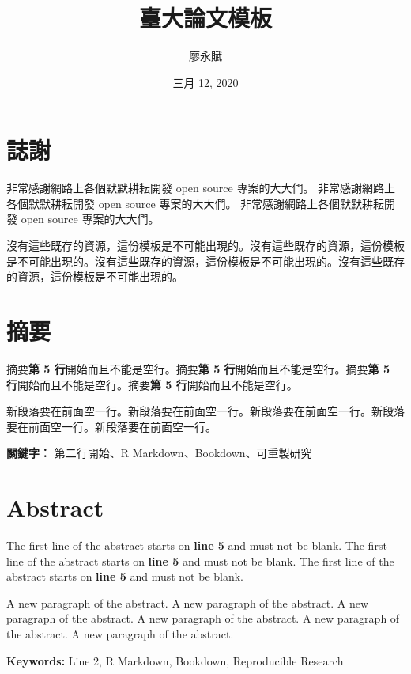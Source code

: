 \documentclass[oneside]{book}
\title{臺大論文模板}
\author{廖永賦}
\date{三月 12, 2020}
\begin{document}


\clearpage
{}

{}



\chapter*{誌謝}
非常感謝網路上各個默默耕耘開發 open source 專案的大大們。
非常感謝網路上各個默默耕耘開發 open source 專案的大大們。
非常感謝網路上各個默默耕耘開發 open source 專案的大大們。

沒有這些既存的資源，這份模板是不可能出現的。沒有這些既存的資源，這份模板是不可能出現的。沒有這些既存的資源，這份模板是不可能出現的。沒有這些既存的資源，這份模板是不可能出現的。


\chapter*{摘要}
摘要\textbf{第 5 行}開始而且不能是空行。摘要\textbf{第 5 行}開始而且不能是空行。摘要\textbf{第 5 行}開始而且不能是空行。摘要\textbf{第 5 行}開始而且不能是空行。

新段落要在前面空一行。新段落要在前面空一行。新段落要在前面空一行。新段落要在前面空一行。新段落要在前面空一行。
\bigbreak

\noindent
\textbf{關鍵字：} 第二行開始、R Markdown、Bookdown、可重製研究

\chapter*{Abstract}
The first line of the abstract starts on \textbf{line 5} and must not be blank. The first line of the abstract starts on \textbf{line 5} and must not be blank. The first line of the abstract starts on \textbf{line 5} and must not be blank.

A new paragraph of the abstract. A new paragraph of the abstract. A new paragraph of the abstract. A new paragraph of the abstract. A new paragraph of the abstract. A new paragraph of the abstract.
\bigbreak

\noindent
\textbf{Keywords:} Line 2, R Markdown, Bookdown, Reproducible Research
\end{document}
